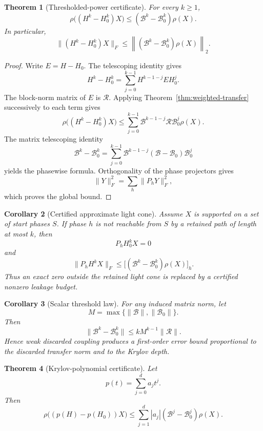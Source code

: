 \documentclass[11pt]{article}
\newtheorem{theorem}{Theorem}[section]
\newtheorem{corollary}[theorem]{Corollary}
\theoremstyle{definition}
\theoremstyle{remark}
\begin{document}
\begin{theorem}[Thresholded-power certificate]
\label{thm:thresholded-power}
For every $k\geq1$,
\[
\boxed{
\rho\bigl((H^k-H_0^k)X\bigr)
\leq
(\mathcal B^k-\mathcal B_0^k)\rho(X).
}
\]
In particular,
\[
\boxed{
\lVert(H^k-H_0^k)X\rVert_F
\leq
\left\lVert(\mathcal B^k-\mathcal B_0^k)\rho(X)\right\rVert_2.
}
\]
\end{theorem}

\begin{proof}
Write $E=H-H_0$.  The telescoping identity gives
\[
H^k-H_0^k
=
\sum_{j=0}^{k-1}H^{k-1-j}EH_0^j.
\]
The block-norm matrix of $E$ is $\mathcal R$.  Applying
Theorem~\ref{thm:weighted-transfer} successively to each term gives
\[
\rho\bigl((H^k-H_0^k)X\bigr)
\leq
\sum_{j=0}^{k-1}
\mathcal B^{k-1-j}\mathcal R\mathcal B_0^j\rho(X).
\]
The matrix telescoping identity
\[
\mathcal B^k-\mathcal B_0^k
=
\sum_{j=0}^{k-1}
\mathcal B^{k-1-j}(\mathcal B-\mathcal B_0)\mathcal B_0^j
\]
yields the phasewise formula.  Orthogonality of the phase projectors gives
\[
\lVert Y\rVert_F^2=\sum_h\lVert P_hY\rVert_F^2,
\]
which proves the global bound.
\end{proof}

\begin{corollary}[Certified approximate light cone]
\label{cor:approx-lightcone}
Assume $X$ is supported on a set of start phases $S$.  If phase $h$ is not
reachable from $S$ by a retained path of length at most $k$, then
\[
P_hH_0^kX=0
\]
and
\[
\boxed{
\lVert P_hH^kX\rVert_F
\leq
\bigl[(\mathcal B^k-\mathcal B_0^k)\rho(X)\bigr]_h.
}
\]
Thus an exact zero outside the retained light cone is replaced by a certified
nonzero leakage budget.
\end{corollary}

\begin{corollary}[Scalar threshold law]\label{claim:final-15-4}
For any induced matrix norm, let
\[
M=\max\{\lVert\mathcal B\rVert,\lVert\mathcal B_0\rVert\}.
\]
Then
\[
\boxed{
\lVert\mathcal B^k-\mathcal B_0^k\rVert
\leq
kM^{k-1}\lVert\mathcal R\rVert.
}
\]
Hence weak discarded coupling produces a first-order error bound proportional
to the discarded transfer norm and to the Krylov depth.
\end{corollary}

\begin{theorem}[Krylov-polynomial certificate]
\label{thm:polynomial-certificate}
Let
\[
p(t)=\sum_{j=0}^d a_jt^j.
\]
Then
\[
\boxed{
\rho\bigl((p(H)-p(H_0))X\bigr)
\leq
\sum_{j=1}^d
|a_j|(\mathcal B^j-\mathcal B_0^j)\rho(X).
}
\]
\end{theorem}
\end{document}
